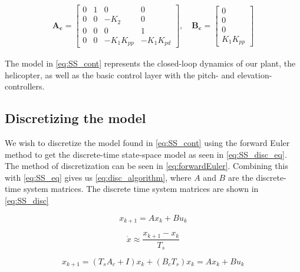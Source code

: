 \begin{equation}\label{eq:SS_cont}
    \begin{aligned}
        \mathbf{A_c} =
        \begin{bmatrix} 0 & 1 & 0 & 0 \\ 0 & 0 & -K_2 & 0 \\ 0 & 0 & 0 & 1 \\ 0 & 0 & -K_1K_{pp} & -K_1K_{pd} \end{bmatrix}, \quad
        \mathbf{B_c} = 
        \begin{bmatrix} 0 \\ 0 \\ 0 \\ K_1K_{pp} \end{bmatrix}
    \end{aligned}
\end{equation}

The model in \cref{eq:SS_cont} represents the closed-loop dynamics of our plant, the helicopter, as well as the basic control layer with the pitch- and elevation-controllers.

\subsection{Discretizing the model}\label{sec:discSS}
We wish to discretize the model found in \cref{eq:SS_cont} using the forward Euler method to get the discrete-time state-space model as seen in \cref{eq:SS_disc_eq}. The method of discretization can be seen in \cref{eq:forwardEuler}. Combining this with \cref{eq:SS_eq} gives us \cref{eq:disc_algorithm}, where $A$ and $B$ are the discrete-time system matrices. The discrete time system matrices are shown in \cref{eq:SS_disc}

\begin{equation}\label{eq:SS_disc_eq}
    x_{k+1} = Ax_k + Bu_k
\end{equation}


\begin{equation}\label{eq:forwardEuler}
    \dot{x} \approx \frac{x_{k+1}-x_k}{T_s}
\end{equation}

\begin{equation}\label{eq:disc_algorithm}
    x_{k+1} = (T_sA_c + I)x_k + (B_cT_s)x_k = Ax_k + Bu_k
\end{equation}


